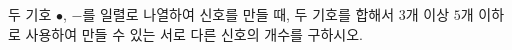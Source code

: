 두 기호 $\bullet$, $-$를 일렬로 나열하여 신호를 만들 때, 두 기호를 합해서 $3$개 이상 $5$개 이하로 사용하여 만들 수 있는 서로 다른 신호의 개수를 구하시오.
